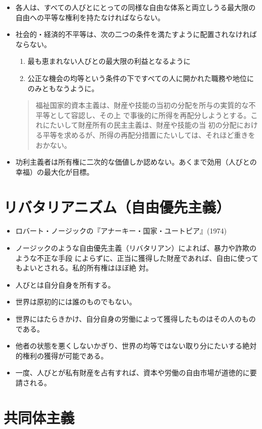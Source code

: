 \begin{itemize}

  \item 各人は、すべての人びとにとっての同様な自由な体系と両立しうる最大限の自由への平等な権利を持たなければならない。
  \item 社会的・経済的不平等は、次の二つの条件を満たすように配置されなければならない。
\begin{enumerate}
    \item 最も恵まれない人びとの最大限の利益となるように
    \item 公正な機会の均等という条件の下ですべての人に開かれた職務や地位にのみともなうように。
    \end{enumerate}

  \begin{quote}
    福祉国家的資本主義は、財産や技能の当初の分配を所与の実質的な不平等として容認し、その上
    で事後的に所得を再配分しようとする。これにたいして財産所有の民主主義は、財産や技能の当
    初の分配における平等を求めるが、所得の再配分措置にたいしては、それほど重きをおかない。
  \end{quote}

\item 功利主義者は所有権に二次的な価値しか認めない。あくまで効用（人びとの幸福）の最大化が目標。

\end{itemize}


\section{リバタリアニズム（自由優先主義）}

\begin{itemize}

\item ロバート・ノージックの『アナーキー・国家・ユートピア』(1974)
\item ノージックのような自由優先主義（リバタリアン）によれば、暴力や詐欺のような不正な手段
  によらずに、正当に獲得した財産であれば、自由に使ってもよいとされる。私的所有権はほぼ絶
  対。
  \item 人びとは自分自身を所有する。
  \item 世界は原初的には誰のものでもない。
  \item 世界にはたらきかけ、自分自身の労働によって獲得したものはその人のものである。
  \item 他者の状態を悪くしないかぎり、世界の均等ではない取り分にたいする絶対的権利の獲得が可能である。
   \item 一度、人びとが私有財産を占有すれば、資本や労働の自由市場が道徳的に要請される。

   

\end{itemize}


\section{共同体主義}




\nocite{nozick74:_anarc_state_and_utopia}
\nocite{有福孝岳99:エチカ,坂井明宏07:現代倫理学}
\nocite{rawls71:_theor_of_justic}
\nocite{川本隆史95:現代倫理学の冒険}
